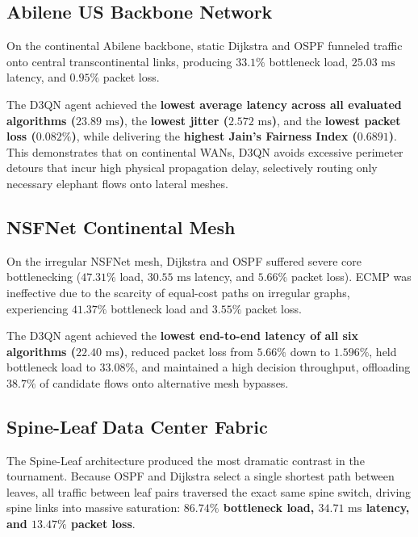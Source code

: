 \documentclass[12pt,a4paper,oneside]{report}
\begin{document}
\subsection{Abilene US Backbone Network}
On the continental Abilene backbone, static Dijkstra and OSPF funneled traffic onto central transcontinental links, producing $33.1\%$ bottleneck load, $25.03\text{ ms}$ latency, and $0.95\%$ packet loss. 

The D3QN agent achieved the \textbf{lowest average latency across all evaluated algorithms ($23.89\text{ ms}$)}, the \textbf{lowest jitter ($2.572\text{ ms}$)}, and the \textbf{lowest packet loss ($0.082\%$)}, while delivering the \textbf{highest Jain's Fairness Index ($0.6891$)}. This demonstrates that on continental WANs, D3QN avoids excessive perimeter detours that incur high physical propagation delay, selectively routing only necessary elephant flows onto lateral meshes.

\subsection{NSFNet Continental Mesh}
On the irregular NSFNet mesh, Dijkstra and OSPF suffered severe core bottlenecking ($47.31\%$ load, $30.55\text{ ms}$ latency, and $5.66\%$ packet loss). ECMP was ineffective due to the scarcity of equal-cost paths on irregular graphs, experiencing $41.37\%$ bottleneck load and $3.55\%$ packet loss.

The D3QN agent achieved the \textbf{lowest end-to-end latency of all six algorithms ($22.40\text{ ms}$)}, reduced packet loss from $5.66\%$ down to \textbf{$1.596\%$}, held bottleneck load to \textbf{$33.08\%$}, and maintained a high decision throughput, offloading $38.7\%$ of candidate flows onto alternative mesh bypasses.

\subsection{Spine-Leaf Data Center Fabric}
The Spine-Leaf architecture produced the most dramatic contrast in the tournament. Because OSPF and Dijkstra select a single shortest path between leaves, all traffic between leaf pairs traversed the exact same spine switch, driving spine links into massive saturation: \textbf{$86.74\%$ bottleneck load, $34.71\text{ ms}$ latency, and $13.47\%$ packet loss}.
\end{document}
